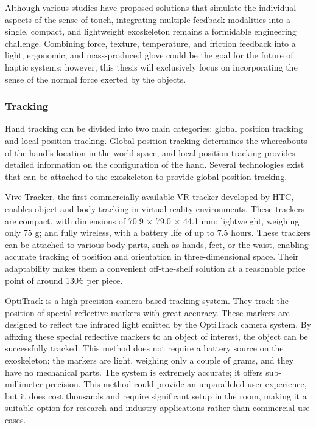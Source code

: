 \bigskip \noindent
Although various studies have proposed solutions that simulate the individual aspects of the sense of touch, integrating multiple feedback modalities into a single, compact, and lightweight exoskeleton remains a formidable engineering challenge. Combining force, texture, temperature, and friction feedback into a light, ergonomic, and mass-produced glove could be the goal for the future of haptic systems; however, this thesis will exclusively focus on incorporating the sense of the normal force exerted by the objects.

\subsubsection{Tracking}
Hand tracking can be divided into two main categories: global position tracking and local position tracking. Global position tracking determines the whereabouts of the hand's location in the world space, and local position tracking provides detailed information on the configuration of the hand. Several technologies exist that can be attached to the exoskeleton to provide global position tracking.

\bigskip \noindent
Vive Tracker, the first commercially available VR tracker developed by HTC, enables object and body tracking in virtual reality environments. These trackers are compact, with dimensions of 70.9 × 79.0 × 44.1 mm; lightweight, weighing only 75 g; and fully wireless, with a battery life of up to 7.5 hours. These trackers can be attached to various body parts, such as hands, feet, or the waist, enabling accurate tracking of position and orientation in three-dimensional space. Their adaptability makes them a convenient off-the-shelf solution at a reasonable price point of around 130€ per piece.

\bigskip \noindent
OptiTrack is a high-precision camera-based tracking system. They track the position of special reflective markers with great accuracy. These markers are designed to reflect the infrared light emitted by the OptiTrack camera system. By affixing these special reflective markers to an object of interest, the object can be successfully tracked. This method does not require a battery source on the exoskeleton; the markers are light, weighing only a couple of grams, and they have no mechanical parts. The system is extremely accurate; it offers sub-millimeter precision. This method could provide an unparalleled user experience, but it does cost thousands and require significant setup in the room, making it a suitable option for research and industry applications rather than commercial use cases.


